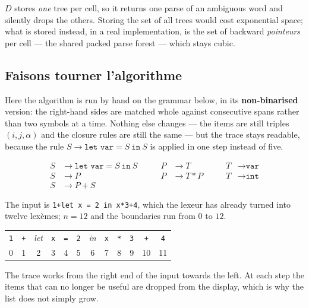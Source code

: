 \begin{remark}
  $D$ stores \emph{one} tree per cell, so it returns one parse of an ambiguous
  word and silently drops the others. Storing the set of all trees would cost
  exponential space; what is stored instead, in a real implementation, is the
  set of backward \emph{pointeurs} per cell --- the shared packed parse forest
  --- which stays cubic.
\end{remark}

\subsection{Faisons tourner l'algorithme}
Here the algorithm is run by hand on the grammar below, in its
\textbf{non-binarised} version: the right-hand sides are matched whole against
consecutive spans rather than two symbols at a time. Nothing else changes ---
the items are still triples $(i,j,\alpha)$ and the closure rules are still the
same --- but the trace stays readable, because the rule
$S \to \texttt{let var} = S\ \texttt{in}\ S$ is applied in one step instead of
five.

\[
  \begin{aligned}
    S &\to \texttt{let var} = S\ \texttt{in}\ S & \qquad P &\to T   & \qquad T &\to \texttt{var} \\
    S &\to P                                    & \qquad P &\to T*P & \qquad T &\to \texttt{int} \\
    S &\to P+S                                  &          &       &          &
  \end{aligned}
\]

\noindent The input is \verb|1+let x = 2 in x*3+4|, which the lexeur has already
turned into twelve lexèmes; $n = 12$ and the boundaries run from $0$ to $12$.

\begin{center}
  \begin{tabular}{c|c|c|c|c|c|c|c|c|c|c|c}
    \toprule
    \texttt{1} & \texttt{+} & \textit{let} & \texttt{x} & \texttt{=} & \texttt{2}
    & \textit{in} & \texttt{x} & \texttt{*} & \texttt{3} & \texttt{+} & \texttt{4} \\
    0 & 1 & 2 & 3 & 4 & 5 & 6 & 7 & 8 & 9 & 10 & 11 \\
    \bottomrule
  \end{tabular}
\end{center}

The trace works from the right end of the input towards the left. At each step
the items that can no longer be useful are dropped from the display, which is
why the list does not simply grow.

